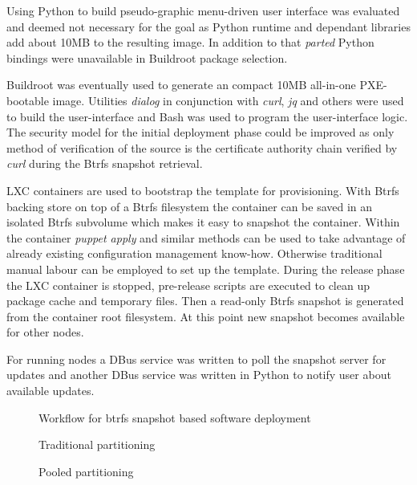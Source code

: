 \documentclass{article}
\begin{document}
Using Python to build pseudo-graphic menu-driven user interface was
evaluated and deemed not necessary for the goal as Python runtime and
dependant libraries add about 10MB to the resulting image.
In addition to that \emph{parted} Python bindings were unavailable
in Buildroot package selection.

Buildroot was eventually used to generate an compact 10MB all-in-one
PXE-bootable image. Utilities \emph{dialog} in conjunction with
\emph{curl}, \emph{jq} and others were used to build the user-interface
and Bash was used to program the user-interface logic.
The security model for the initial deployment phase could be improved
as only method of verification of the source is the certificate
authority chain verified by \emph{curl} during the Btrfs snapshot
retrieval.

LXC containers are used to bootstrap the template for provisioning.
With Btrfs backing store on top of a Btrfs filesystem the container
can be saved in an isolated Btrfs subvolume which makes it easy to
snapshot the container.
Within the container \emph{puppet apply} and similar methods can be used
to take advantage of already existing configuration management know-how.
Otherwise traditional manual labour can be employed to set up the template.
During the release phase the LXC container is stopped, pre-release scripts
are executed to clean up package cache and temporary files.
Then a read-only Btrfs snapshot is generated from the container root filesystem.
At this point new snapshot becomes available for other nodes.

For running nodes a DBus service was written to poll the snapshot server
for updates and another DBus service was written in Python to notify user
about available updates.

\begin{figure}[!htb]
\centering
\scalebox{0.5}{}
\caption{Workflow for btrfs snapshot based software deployment}
\label{fig:digraph}
\end{figure}

\begin{figure}[!htb]
\centering
\scalebox{0.5}{}
\caption{Traditional partitioning}
\label{fig:digraph}
\end{figure}

\begin{figure}[!htb]
\centering
\scalebox{0.5}{}
\caption{Pooled partitioning}
\label{fig:digraph}
\end{figure}
\end{document}
